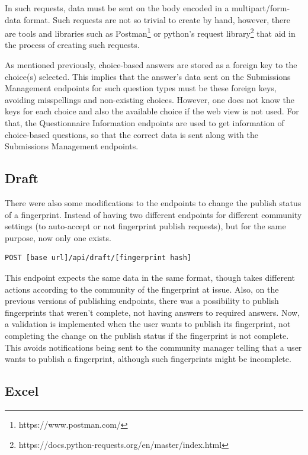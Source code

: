 In such requests, data must be sent on the body encoded in a multipart/form-data format.
Such requests are not so trivial to create by hand, however, there are tools and libraries such as Postman\footnote{https://www.postman.com/} or python's request library\footnote{https://docs.python-requests.org/en/master/index.html} that aid in the process of creating such requests.

As mentioned previously, choice-based answers are stored as a foreign key to the choice(s) selected.
This implies that the answer's data sent on the Submissions Management endpoints for such question types must be these foreign keys, avoiding misspellings and non-existing choices.
However, one does not know the keys for each choice and also the available choice if the web view is not used.
For that, the Questionnaire Information endpoints are used to get information of choice-based questions, so that the correct data is sent along with the Submissions Management endpoints.

\subsection*{Draft}

There were also some modifications to the endpoints to change the publish status of a fingerprint.
Instead of having two different endpoints for different community settings (to auto-accept or not fingerprint publish requests), but for the same purpose, now only one exists.

\begin{verbatim}
POST [base url]/api/draft/[fingerprint hash]
\end{verbatim}

This endpoint expects the same data in the same format, though takes different actions according to the community of the fingerprint at issue.
Also, on the previous versions of publishing endpoints, there was a possibility to publish fingerprints that weren't complete, not having answers to required answers.
Now, a validation is implemented when the user wants to publish its fingerprint, not completing the change on the publish status if the fingerprint is not complete.
This avoids notifications being sent to the community manager telling that a user wants to publish a fingerprint, although such fingerprints might be incomplete.

\subsection{Excel}

